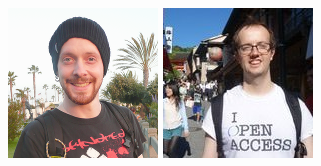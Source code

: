\documentclass{beamer}
\begin{document}
\begin{frame}
\begin{columns}
        \begin{column}{.2\textwidth}
            \begin{center}
                \includegraphics[width=.8\textwidth]{img/fellows/robert-paul-davey_thumb2.png}
                \vspace{.2cm}
                \includegraphics[width=.8\textwidth]{img/fellows/ross-mounce_thumb.jpg}
                \vspace{.2cm}

\end{center}
\end{column}
\end{columns}
\end{frame}
\end{document}
